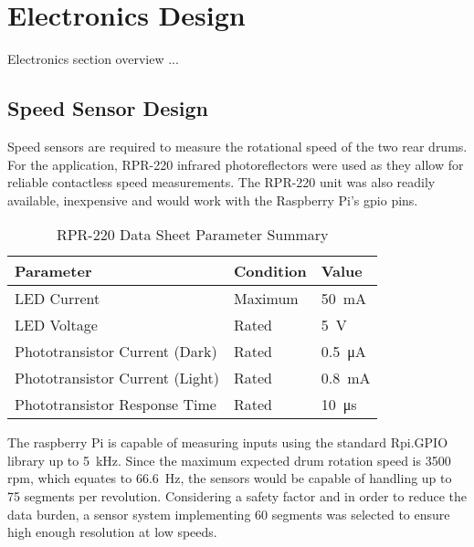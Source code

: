 \newpage

\chapter{Electronics Design}

Electronics section overview ...

\newpage

\section{Speed Sensor Design}

Speed sensors are required to measure the rotational speed of the two rear drums. For the application, RPR-220 infrared photoreflectors were used as they allow for reliable contactless speed measurements. The RPR-220 unit was also readily available, inexpensive and would work with the Raspberry Pi's \acs{gpio} pins.

\begin{table}[H]
	\centering
	\caption{RPR-220 Data Sheet Parameter Summary}
	\citep{RPR:2015}
	\begin{tabularx}{\textwidth}{X >{\raggedright}p{3cm} >{\raggedright\arraybackslash}p{2cm} }
		\toprule
		Parameter                       & Condition & Value                   \\
		\midrule
		LED Current                     & Maximum   & \SI{50}{\milli\ampere}  \\
		LED Voltage                     & Rated     & \SI{5}{\volt}           \\
		Phototransistor Current (Dark)  & Rated     & \SI{0.5}{\micro\ampere} \\
		Phototransistor Current (Light) & Rated     & \SI{0.8}{\milli\ampere} \\
		Phototransistor Response Time   & Rated     & \SI{10}{\micro\second}  \\
		\bottomrule
	\end{tabularx}
	\label{tab:rprdata}
\end{table}

The raspberry Pi is capable of measuring inputs using the standard Rpi.GPIO library up to \SI{5}{\kilo\hertz}. Since the maximum expected drum rotation speed is 3500 \acs{rpm}, which equates to \SI{66.6}{\hertz}, the sensors would be capable of handling up to 75 segments per revolution. Considering a safety factor and in order to reduce the data burden, a sensor system implementing 60 segments was selected to ensure high enough resolution at low speeds.

